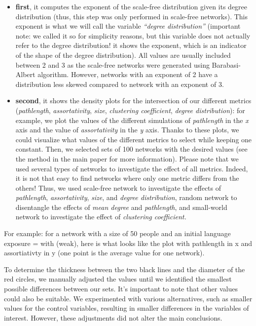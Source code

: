 \documentclass[
]{article}
\begin{document}
\begin{itemize}
\item
  \textbf{first}, it computes the exponent of the scale-free
  distribution given its degree distribution (thus, this step was only
  performed in scale-free networks). This exponent is what we will call
  the variable \emph{``degree distribution''} (important note: we called
  it so for simplicity reasons, but this variable does not actually
  refer to the degree distribution! it shows the exponent, which is an
  indicator of the shape of the degree distribution). All values are
  usually included between 2 and 3 as the scale-free networks were
  generated using Barabasi-Albert algorithm. However, networks with an
  exponent of 2 have a distribution less skewed compared to network with
  an exponent of 3.
\item
  \textbf{second}, it shows the density plots for the intersection of
  our different metrics (\emph{pathlength}, \emph{assortativity},
  \emph{size}, \emph{clustering coefficient}, \emph{degree
  distribution}): for example, we plot the values of the different
  simulations of \emph{pathlength} in the \emph{x} axis and the value of
  \emph{assortativity} in the \emph{y} axis. Thanks to these plots, we
  could visualize what values of the different metrics to select while
  keeping one constant. Then, we selected sets of 100 networks with the
  desired values (see the method in the main paper for more
  information). Please note that we used several types of networks to
  investigate the effect of all metrics. Indeed, it is not that easy to
  find networks where only one metric differs from the others! Thus, we
  used scale-free network to investigate the effects of
  \emph{pathlength}, \emph{assortativity}, \emph{size}, and \emph{degree
  distribution}, random network to disentangle the effects of \emph{mean
  degree} and \emph{pathlength}, and small-world network to investigate
  the effect of \emph{clustering coefficient.}
\end{itemize}

For example: for a network with a size of 50 people and an initial
language exposure = with (weak), here is what looks like the plot with
pathlength in x and assortiativty in y (one point is the average value
for one network).

To determine the thickness between the two black lines and the diameter
of the red circles, we manually adjusted the values until we identified
the smallest possible differences between our sets. It's important to
note that other values could also be suitable. We experimented with
various alternatives, such as smaller values for the control variables,
resulting in smaller differences in the variables of interest. However,
these adjustments did not alter the main conclusions.
\end{document}
